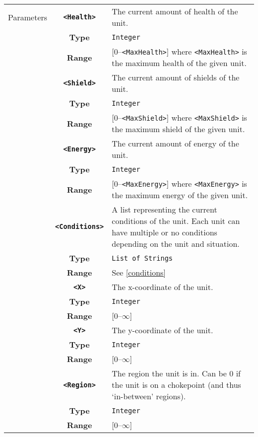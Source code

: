  \begin{tabularx}{\textwidth}{l | c | p{8cm}|}
 \cline{2-3}
 Parameters & \textbf{\verb|<Health>|} & The current amount of health of the unit.\\
            & \textbf{Type} & \verb|Integer| \\
            & \textbf{Range} & [0--\verb|<MaxHealth>|] where \verb|<MaxHealth>| is the maximum health of the given unit.\\
            \cline{2-3}
            & \textbf{\verb|<Shield>|} & The current amount of shields of the unit. \\
            & \textbf{Type} & \verb|Integer| \\
            & \textbf{Range} & [0--\verb|<MaxShield>|] where \verb|<MaxShield>| is the maximum shield of the given unit. \\
            \cline{2-3}
            & \textbf{\verb|<Energy>|} & The current amount of energy of the unit. \\
            & \textbf{Type} & \verb|Integer| \\
            & \textbf{Range} & [0--\verb|<MaxEnergy>|] where \verb|<MaxEnergy>| is the maximum energy of the given unit. \\
            \cline{2-3}
            & \textbf{\verb|<Conditions>|} & A list representing the current conditions of the unit. Each unit can have multiple or no conditions depending on the unit and situation.\\
            & \textbf{Type} & \verb|List of Strings| \\
            & \textbf{Range} & See \ref{conditions} \\
            \cline{2-3}
            & \textbf{\verb|<X>|} & The x-coordinate of the unit. \\
            & \textbf{Type} & \verb|Integer| \\
            &\textbf{Range} &  [0--$\infty$] \\
            \cline{2-3}
            & \textbf{\verb|<Y>|} & The y-coordinate of the unit. \\
            & \textbf{Type} & \verb|Integer| \\
            &\textbf{Range} & [0--$\infty$] \\
            \cline{2-3}
            & \textbf{\verb|<Region>|} & The region the unit is in. Can be 0 if the unit is on a chokepoint (and thus `in-between' regions).\\
            & \textbf{Type} & \verb|Integer| \\
            & \textbf{Range} & [0--$\infty$] \\
            \cline{2-3}
\end{tabularx}


